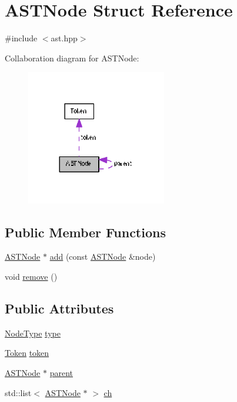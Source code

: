 \hypertarget{struct_a_s_t_node}{}\section{A\+S\+T\+Node Struct Reference}
\label{struct_a_s_t_node}


{\ttfamily \#include $<$ast.\+hpp$>$}



Collaboration diagram for A\+S\+T\+Node\+:\nopagebreak
\begin{figure}[H]
\begin{center}
\leavevmode
\includegraphics[width=173pt]{struct_a_s_t_node__coll__graph}
\end{center}
\end{figure}
\subsection*{Public Member Functions}
\begin{DoxyCompactItemize}
\item 
\hyperlink{struct_a_s_t_node}{A\+S\+T\+Node} $\ast$ \hyperlink{struct_a_s_t_node_adbcbd09d75a8056a48e9e9071ad8fa3e}{add} (const \hyperlink{struct_a_s_t_node}{A\+S\+T\+Node} \&node)
\item 
void \hyperlink{struct_a_s_t_node_a5198921818aa511746856219cec0b637}{remove} ()
\end{DoxyCompactItemize}
\subsection*{Public Attributes}
\begin{DoxyCompactItemize}
\item 
\hyperlink{ast_8hpp_acac9cbaeea226ed297804c012dc12b16}{Node\+Type} \hyperlink{struct_a_s_t_node_a34086f3bc5af008f08f255c8ec57ba21}{type}
\item 
\hyperlink{struct_token}{Token} \hyperlink{struct_a_s_t_node_a99c0fc8e2fe4c99fbe85d0d195cfab57}{token}
\item 
\hyperlink{struct_a_s_t_node}{A\+S\+T\+Node} $\ast$ \hyperlink{struct_a_s_t_node_aaa1e479bfeb485d93a4866f9c2daf171}{parent}
\item 
std\+::list$<$ \hyperlink{struct_a_s_t_node}{A\+S\+T\+Node} $\ast$ $>$ \hyperlink{struct_a_s_t_node_ab50690af3aacf5c7dbd0440505fd5595}{ch}
\end{DoxyCompactItemize}


